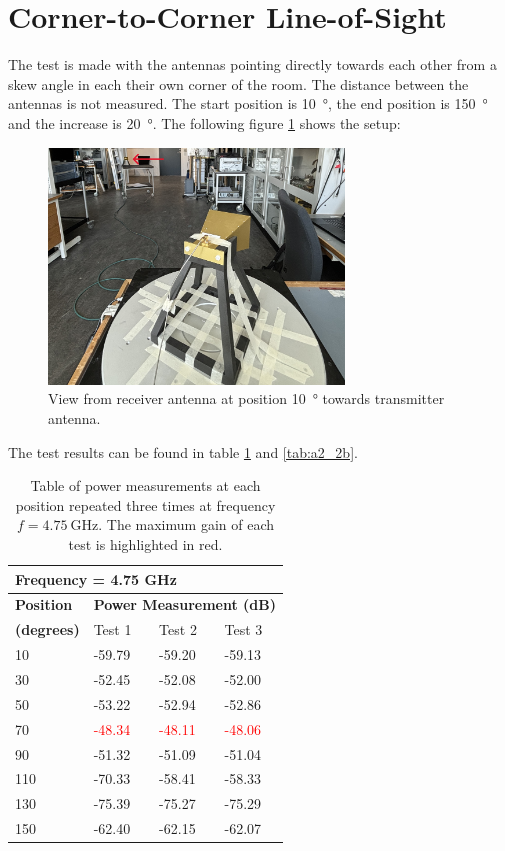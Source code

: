 \section{Corner-to-Corner Line-of-Sight}
The test is made with the antennas pointing directly towards each other from a skew angle in each their own corner of the room. The distance between the antennas is not measured. The start position is \SI{10}{\degree}, the end position is \SI{150}{\degree} and the increase is \SI{20}{\degree}. The following figure \ref{fig:a2_2} shows the setup:
\begin{figure}[H]
    \centering
    \includegraphics[width=0.7\textwidth]{figures/test_los_corner.JPG}
    \caption{View from receiver antenna at position \SI{10}{\degree} towards transmitter antenna.} \label{fig:a2_2}
\end{figure}

The test results can be found in table \ref{tab:a2_2a} and \ref{tab:a2_2b}.
\begin{table}[H]
    \centering
    \begin{tabular}{l|l|l|l}
        \multicolumn{4}{l}{\textbf{Frequency = 4.75 GHz}}         \\
        \hline
        \textbf{Position} & \multicolumn{3}{l}{\textbf{Power Measurement (dB)}} \\
        \textbf{(degrees)}  & Test 1    & Test 2  & Test 3  \\
        \hline
        \hline
        10      & -59.79    & -59.20    & -59.13 \\
        30      & -52.45    & -52.08    & -52.00 \\
        50      & -53.22    & -52.94    & -52.86 \\
        70      & \textcolor{red}{-48.34}    & \textcolor{red}{-48.11}    & \textcolor{red}{-48.06} \\
        90      & -51.32    & -51.09    & -51.04 \\
        110     & -70.33    & -58.41    & -58.33 \\
        130     & -75.39    & -75.27    & -75.29 \\
        150     & -62.40    & -62.15    & -62.07
        \end{tabular}
    \caption{Table of power measurements at each position repeated three times at frequency $f=\SI{4.75}{\giga\hertz}$. The maximum gain of each test is highlighted in red.}
    \label{tab:a2_2a}
\end{table}

